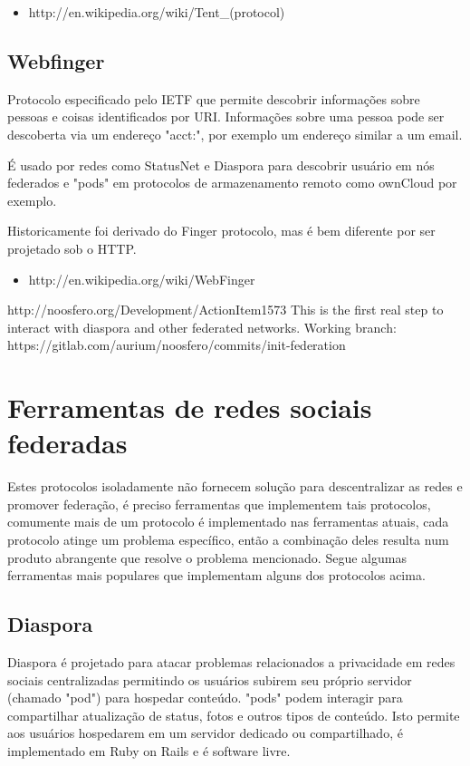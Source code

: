\documentclass[12pt]{article}
\begin{document}
\begin{itemize}
  \item http://en.wikipedia.org/wiki/Tent\_(protocol)
\end{itemize}

\subsection{Webfinger}

Protocolo especificado pelo IETF que permite descobrir informações sobre
pessoas e coisas identificados por URI. Informações sobre uma pessoa pode ser
descoberta via um endereço "acct:", por exemplo um endereço similar a um
email.

É usado por redes como StatusNet e Diaspora para descobrir usuário em nós
federados e "pods" em protocolos de armazenamento remoto como ownCloud por
exemplo.

Historicamente foi derivado do Finger protocolo, mas é bem diferente por ser
projetado sob o HTTP.

\begin{itemize}
  \item http://en.wikipedia.org/wiki/WebFinger
\end{itemize}

http://noosfero.org/Development/ActionItem1573
This is the first real step to interact with diaspora and other federated networks.
Working branch: https://gitlab.com/aurium/noosfero/commits/init-federation

\section{Ferramentas de redes sociais federadas}

Estes protocolos isoladamente não fornecem solução para descentralizar as
redes e promover federação, é preciso ferramentas que implementem tais
protocolos, comumente mais de um protocolo é implementado nas ferramentas
atuais, cada protocolo atinge um problema específico, então a combinação deles
resulta num produto abrangente que resolve o problema mencionado. Segue
algumas ferramentas mais populares que implementam alguns dos protocolos
acima.

\subsection{Diaspora}

Diaspora é projetado para atacar problemas relacionados a privacidade em redes
sociais centralizadas permitindo os usuários subirem seu próprio servidor
(chamado "pod") para hospedar conteúdo. "pods" podem interagir para
compartilhar atualização de status, fotos e outros tipos de conteúdo. Isto
permite aos usuários hospedarem em um servidor dedicado ou compartilhado, é
implementado em Ruby on Rails e é software livre.
\end{document}
